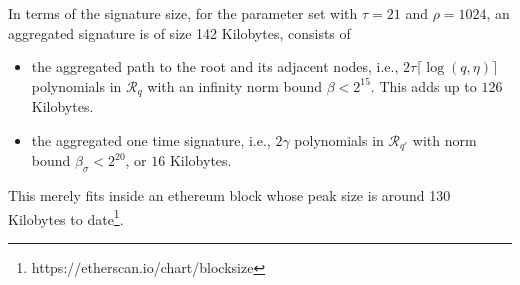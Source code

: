 In terms of the signature size, for the parameter set with $\tau=21$ and $\rho=1024$,
an aggregated signature is of size 142 Kilobytes, consists of 
\begin{itemize}
  \item the aggregated path to the root and its adjacent nodes, i.e., $2\tau\lceil\log(q, \eta)\rceil$ polynomials in $\mathcal{R}_q$ with an infinity norm bound $\beta <2^{15}$. This adds up to $126$ Kilobytes.
  \item the aggregated one time signature, i.e., $2\gamma$ polynomials in $\mathcal{R}_{q'}$ with norm bound $\beta_\sigma < 2^{20}$, or $16$ Kilobytes.
\end{itemize}
This merely fits inside an ethereum block whose peak size is around 130 Kilobytes to date\footnote{https://etherscan.io/chart/blocksize}.


